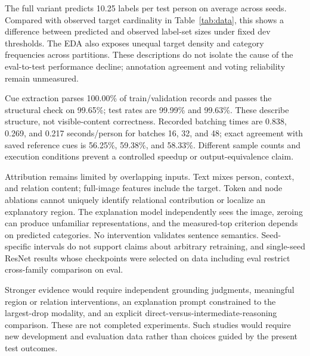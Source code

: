 \documentclass[conference]{IEEEtran}
\newcommand{\ev}[2]{#2}
\begin{document}
The full variant predicts 10.25 labels per test person on average across seeds. Compared with observed target cardinality in Table~\ref{tab:data}, this shows a difference between predicted and observed label-set sizes under fixed dev thresholds. The EDA also exposes unequal target density and category frequencies across partitions. These descriptions do not isolate the cause of the eval-to-test performance decline; annotation agreement and voting reliability remain unmeasured.

Cue extraction parses \ev{cue-parse_rate}{100.00}\% of train/validation records and passes the structural check on \ev{cue-schema_rate}{99.65}\%; test rates are \ev{test-cue-parse_rate}{99.99}\% and \ev{test-cue-schema_rate}{99.63}\%. These describe structure, not visible-content correctness. Recorded batching times are \ev{batch-16-seconds}{0.838}, \ev{batch-32-seconds}{0.269}, and \ev{batch-48-seconds}{0.217} seconds/person for batches \ev{batch-16}{16}, \ev{batch-32}{32}, and \ev{batch-48}{48}; exact agreement with saved reference cues is \ev{batch-16-same}{56.25}\%, \ev{batch-32-same}{59.38}\%, and \ev{batch-48-same}{58.33}\%. Different sample counts and execution conditions prevent a controlled speedup or output-equivalence claim.

Attribution remains limited by overlapping inputs. Text mixes person, context, and relation content; full-image features include the target. Token and node ablations cannot uniquely identify relational contribution or localize an explanatory region. The explanation model independently sees the image, zeroing can produce unfamiliar representations, and the measured-top criterion depends on predicted categories. No intervention validates sentence semantics. Seed-specific intervals do not support claims about arbitrary retraining, and single-seed ResNet results whose checkpoints were selected on data including eval restrict cross-family comparison on eval.

Stronger evidence would require independent grounding judgments, meaningful region or relation interventions, an explanation prompt constrained to the largest-drop modality, and an explicit direct-versus-intermediate-reasoning comparison. These are not completed experiments. Such studies would require new development and evaluation data rather than choices guided by the present test outcomes.
\end{document}
